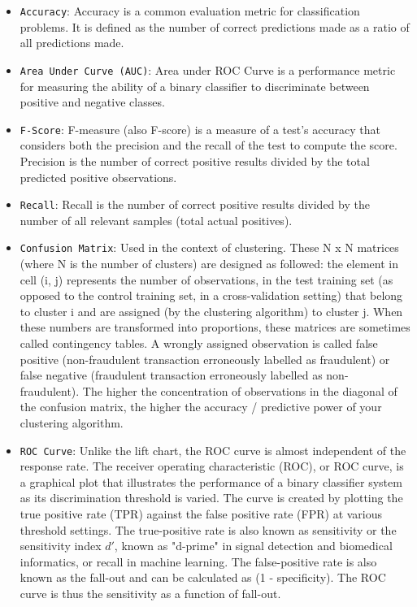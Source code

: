 \documentclass[12pt]{article}
\begin{document}
\begin{itemize}
\item
\texttt{Accuracy}: Accuracy is a common evaluation metric for classification problems. It is defined as the number of correct predictions made as a ratio of all predictions made. 

\item
\texttt{Area Under Curve (AUC)}: Area under ROC Curve is a performance metric for measuring the ability of a binary classifier to discriminate between positive and negative classes.
\item
\texttt{F-Score}: F-measure (also F-score) is a measure of a test’s accuracy that considers both the precision and the recall of the test to compute the score. Precision is the number of correct positive results divided by the total predicted positive observations. 

\item
\texttt{Recall}: Recall is the number of correct positive results divided by the number of all relevant samples (total actual positives).
\item
\texttt{Confusion Matrix}: Used in the context of clustering. These N x N matrices (where N is the number of clusters) are designed as followed: the element in cell (i, j) represents the number of observations, in the test training set (as opposed to the control training set, in a cross-validation setting) that belong to cluster i and are assigned (by the clustering algorithm) to cluster j. When these numbers are transformed into proportions, these matrices are sometimes called contingency tables. A wrongly assigned observation is called false positive (non-fraudulent transaction erroneously labelled as fraudulent) or false negative (fraudulent transaction erroneously labelled as non- fraudulent). The higher the concentration of observations in the diagonal of the confusion matrix, the higher the accuracy / predictive power of your clustering algorithm.

\item
\texttt{ROC Curve}: Unlike the lift chart, the ROC curve is almost independent of the response rate. The receiver operating characteristic (ROC), or ROC curve, is a graphical plot that illustrates the performance of a binary classifier system as its discrimination threshold is varied. The curve is created by plotting the true positive rate (TPR) against the false positive rate (FPR) at various threshold settings. The true-positive rate is also known as sensitivity or the sensitivity index $d'$, known as "d-prime" in signal detection and biomedical informatics, or recall in machine learning. The false-positive rate is also known as the fall-out and can be calculated as (1 - specificity). The ROC curve is thus the sensitivity as a function of fall-out.


\end{itemize}
\end{document}
